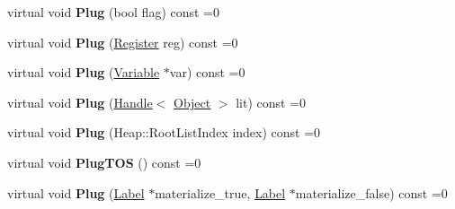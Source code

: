 \begin{DoxyCompactItemize}
\item 
virtual void {\bfseries Plug} (bool flag) const  =0\hypertarget{classv8_1_1internal_1_1_full_code_generator_1_1_b_a_s_e___e_m_b_e_d_d_e_d_a3ed9558a506c0de4ad606f7f6f7edb7c}{}\label{classv8_1_1internal_1_1_full_code_generator_1_1_b_a_s_e___e_m_b_e_d_d_e_d_a3ed9558a506c0de4ad606f7f6f7edb7c}

\item 
virtual void {\bfseries Plug} (\hyperlink{structv8_1_1internal_1_1_register}{Register} reg) const  =0\hypertarget{classv8_1_1internal_1_1_full_code_generator_1_1_b_a_s_e___e_m_b_e_d_d_e_d_abd142cf0700a25b42d4fcf85500b9473}{}\label{classv8_1_1internal_1_1_full_code_generator_1_1_b_a_s_e___e_m_b_e_d_d_e_d_abd142cf0700a25b42d4fcf85500b9473}

\item 
virtual void {\bfseries Plug} (\hyperlink{classv8_1_1internal_1_1_variable}{Variable} $\ast$var) const  =0\hypertarget{classv8_1_1internal_1_1_full_code_generator_1_1_b_a_s_e___e_m_b_e_d_d_e_d_abadfbf1493b275348fa5c580cb9138ab}{}\label{classv8_1_1internal_1_1_full_code_generator_1_1_b_a_s_e___e_m_b_e_d_d_e_d_abadfbf1493b275348fa5c580cb9138ab}

\item 
virtual void {\bfseries Plug} (\hyperlink{classv8_1_1internal_1_1_handle}{Handle}$<$ \hyperlink{classv8_1_1internal_1_1_object}{Object} $>$ lit) const  =0\hypertarget{classv8_1_1internal_1_1_full_code_generator_1_1_b_a_s_e___e_m_b_e_d_d_e_d_a1f7f0044e6e324637a9a516a5084a7c0}{}\label{classv8_1_1internal_1_1_full_code_generator_1_1_b_a_s_e___e_m_b_e_d_d_e_d_a1f7f0044e6e324637a9a516a5084a7c0}

\item 
virtual void {\bfseries Plug} (Heap\+::\+Root\+List\+Index index) const  =0\hypertarget{classv8_1_1internal_1_1_full_code_generator_1_1_b_a_s_e___e_m_b_e_d_d_e_d_ae07eebbfef84b89160b35ae7cb8e7571}{}\label{classv8_1_1internal_1_1_full_code_generator_1_1_b_a_s_e___e_m_b_e_d_d_e_d_ae07eebbfef84b89160b35ae7cb8e7571}

\item 
virtual void {\bfseries Plug\+T\+OS} () const  =0\hypertarget{classv8_1_1internal_1_1_full_code_generator_1_1_b_a_s_e___e_m_b_e_d_d_e_d_ae68b3f49a74970cb604f9d543d18d727}{}\label{classv8_1_1internal_1_1_full_code_generator_1_1_b_a_s_e___e_m_b_e_d_d_e_d_ae68b3f49a74970cb604f9d543d18d727}

\item 
virtual void {\bfseries Plug} (\hyperlink{classv8_1_1internal_1_1_label}{Label} $\ast$materialize\+\_\+true, \hyperlink{classv8_1_1internal_1_1_label}{Label} $\ast$materialize\+\_\+false) const  =0\hypertarget{classv8_1_1internal_1_1_full_code_generator_1_1_b_a_s_e___e_m_b_e_d_d_e_d_a395da010d2da4d0a1b0bf90977ed3b69}{}\label{classv8_1_1internal_1_1_full_code_generator_1_1_b_a_s_e___e_m_b_e_d_d_e_d_a395da010d2da4d0a1b0bf90977ed3b69}


\end{DoxyCompactItemize}
